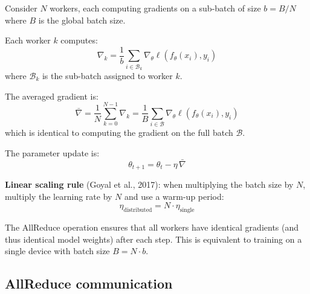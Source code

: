 Consider $N$ workers, each computing gradients on a sub-batch of size
$b = B/N$ where $B$ is the global batch size.

\begin{keyformulas}[title=\textbf{Data-parallel SGD}]
Each worker $k$ computes:
\[
  \nabla_k = \frac{1}{b} \sum_{i \in \mathcal{B}_k}
    \nabla_\theta \ell(f_\theta(x_i), y_i)
\]
where $\mathcal{B}_k$ is the sub-batch assigned to worker $k$.

The averaged gradient is:
\[
  \bar{\nabla} = \frac{1}{N} \sum_{k=0}^{N-1} \nabla_k
    = \frac{1}{B} \sum_{i \in \mathcal{B}}
    \nabla_\theta \ell(f_\theta(x_i), y_i)
\]
which is identical to computing the gradient on the full batch $\mathcal{B}$.

The parameter update is:
\[
  \theta_{t+1} = \theta_t - \eta \, \bar{\nabla}
\]

\textbf{Linear scaling rule} (Goyal et al., 2017): when multiplying the
batch size by $N$, multiply the learning rate by $N$ and use a warm-up
period:
\[
  \eta_{\text{distributed}} = N \cdot \eta_{\text{single}}
\]
\end{keyformulas}

\begin{remark}
The AllReduce operation ensures that all workers have identical gradients
(and thus identical model weights) after each step. This is equivalent
to training on a single device with batch size $B = N \cdot b$.
\end{remark}

\subsection{AllReduce communication}

\begin{center}
\end{center}

